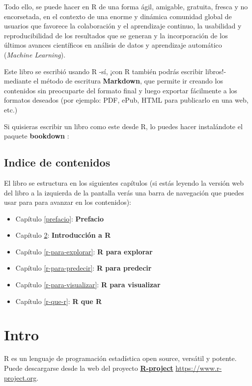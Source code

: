 \documentclass[]{book}
\theoremstyle{definition}
\theoremstyle{definition}
\theoremstyle{remark}
\begin{document}
Todo ello, se puede hacer en R de una forma ágil, amigable, gratuita,
fresca y no encorsetada, en el contexto de una enorme y dinámica
comunidad global de usuarios que favorece la colaboración y el
aprendizaje continuo, la usabilidad y reproducibilidad de los resultados
que se generan y la incorporación de los últimos avances científicos en
análisis de datos y aprendizaje automático (\emph{Machine Learning}).

Este libro se escribió usando R -sí, ¡con R también podrás escribir
libros!- mediante el método de escritura \textbf{Markdown}, que permite
ir creando los contenidos sin preocuparte del formato final y luego
exportar fácilmente a los formatos deseados (por ejemplo: PDF, ePub,
HTML para publicarlo en una web, etc.)

Si quisieras escribir un libro como este desde R, lo puedes hacer
instalándote el paquete \textbf{bookdown} \citep{R-bookdown}:

\section{Indice de contenidos}\label{indice-de-contenidos}

El libro se estructura en los siguientes capítulos (si estás leyendo la
versión web del libro a la izquierda de la pantalla verás una barra de
navegación que puedes usar para para avanzar en los contenidos):

\begin{itemize}
\item
  Capítulo \ref{prefacio}: \textbf{Prefacio}
\item
  Capítulo \ref{intro}: \textbf{Introducción a R}
\item
  Capítulo \ref{r-para-explorar}: \textbf{R para explorar}
\item
  Capítulo \ref{r-para-predecir}: \textbf{R para predecir}
\item
  Capítulo \ref{r-para-visualizar}: \textbf{R para visualizar}
\item
  Capítulo \ref{r-que-r}: \textbf{R que R}
\end{itemize}

\chapter{Intro}\label{intro}

R \citep{R-r} es un lenguaje de programación estadística open source,
versátil y potente. Puede descargarse desde la web del proyecto
\href{https://www.r-project.org}{\textbf{R-project}}
\url{https://www.r-project.org}.
\end{document}
